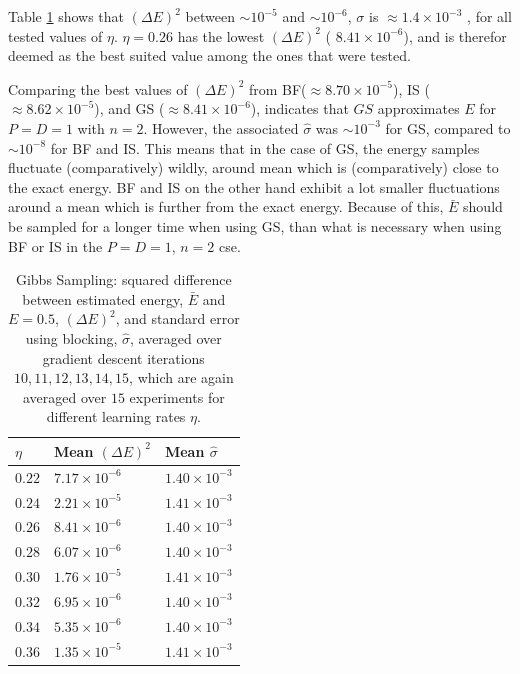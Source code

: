 \documentclass[%
oneside,                 %
final,                   %
10pt]{article}
\begin{document}
Table \ref{table:GD_eta} shows that $(\Delta E)^2$ between $\sim 10^{-5}$ and $\sim 10^{-6}$, $\sigma$ is $\approx 1.4 \times 10^{-3}$ , for all tested values of $\eta$. $\eta=0.26$ has the lowest $(\Delta E)^2$ ( $8.41 \times 10^{-6} $), and is therefor deemed as the best suited value among the ones that were tested. 

Comparing the best values of $(\Delta E)^2$ from BF($\approx 8.70\times 10^{-5 }$), IS ($\approx 8.62\times 10^{-5 }$), and GS ($\approx 8.41\times 10^{ -6 }$), indicates that $GS$ approximates $E$ for $P=D=1$ with $n=2$. However, the associated $\hat \sigma$ was $\sim 10^{-3}$ for GS, compared to $\sim 10^{-8}$ for BF and IS. This means that in the case of GS, the energy samples fluctuate (comparatively) wildly, around mean which is  (comparatively) close to the exact energy. BF and IS on the other hand exhibit a lot smaller fluctuations around a mean which is further from the exact energy.  Because of this, $\bar E$ should be sampled for a longer time when using GS, than what is necessary when using BF or IS in the $P=D=1$, $n=2$ cse. 

\begin{table}[H]
\begin{center}
\begin{tabular}{lll}
\hline
 $\eta$ & Mean $(\Delta E)^2$ & Mean $\hat \sigma$ \\
\hline
$ 0.22 $ &  $ 7.17\times 10^{ -6 } $ & $ 1.40\times 10^{ -3 } $  \\
$ 0.24 $ &  $ 2.21\times 10^{ -5 } $ & $ 1.41\times 10^{ -3 } $  \\
$ 0.26 $ &  $ 8.41\times 10^{ -6 } $ & $ 1.40\times 10^{ -3 } $  \\
$ 0.28 $ &  $ 6.07\times 10^{ -6 } $ & $ 1.40\times 10^{ -3 } $  \\
$ 0.30 $ &  $ 1.76\times 10^{ -5 } $ & $ 1.41\times 10^{ -3 } $  \\
$ 0.32 $ &  $ 6.95\times 10^{ -6 } $ & $ 1.40\times 10^{ -3 } $  \\
$ 0.34 $ &  $ 5.35\times 10^{ -6 } $ & $ 1.40\times 10^{ -3 } $  \\
$ 0.36 $ &  $ 1.35\times 10^{ -5 } $ & $ 1.41\times 10^{ -3 } $  \\

\hline
\end{tabular}
\end{center}
\caption{Gibbs Sampling: squared difference between estimated energy, $\bar E$ and $E=0.5$, $(\Delta E)^2$, and standard error using blocking, $\hat \sigma$, averaged over gradient descent iterations $10,11,12,13,14,15$, which are again averaged over $15$ experiments for different learning rates $\eta$.}
\label{table:GD_eta}
\end{table}
\end{document}
